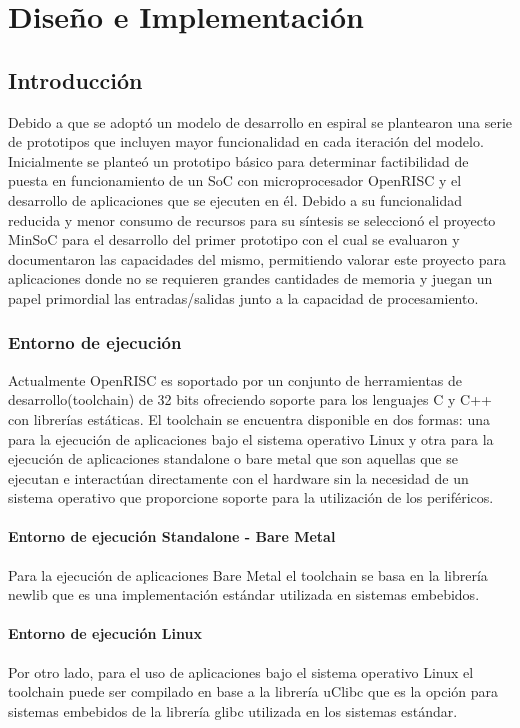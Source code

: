 \chapter{Diseño e Implementación}\label{chap:disenoeimpl}

	\section{Introducción}
	Debido a que se adoptó un modelo de desarrollo en espiral se plantearon una serie de prototipos que incluyen mayor funcionalidad en cada iteración
	del modelo. Inicialmente se planteó un prototipo básico para determinar factibilidad de puesta en funcionamiento de un SoC con microprocesador
	OpenRISC y el desarrollo de aplicaciones que se ejecuten en él. Debido a su funcionalidad reducida y menor consumo de recursos  para su síntesis se
	seleccionó el proyecto MinSoC para el desarrollo del primer prototipo con el cual se evaluaron y documentaron las capacidades del mismo, permitiendo
	valorar este proyecto para aplicaciones donde no se requieren grandes cantidades de memoria y juegan un papel primordial las entradas/salidas junto
	a la capacidad de procesamiento.  
		 
		\subsection{Entorno de ejecución}
		Actualmente OpenRISC es soportado por un conjunto de herramientas de desarrollo(toolchain) de 32 bits ofreciendo soporte para los lenguajes C y C++
		con librerías estáticas. El toolchain se encuentra disponible en dos formas: una para la ejecución de aplicaciones bajo el sistema operativo Linux y
		otra para la ejecución de aplicaciones standalone o bare metal que son aquellas que se ejecutan e interactúan directamente con el hardware sin la
		necesidad de un sistema operativo que proporcione soporte para la utilización de los periféricos.
		
			\subsubsection{Entorno de ejecución Standalone - Bare Metal}
	    	Para la ejecución de aplicaciones Bare Metal el toolchain se basa en la librería newlib que es una implementación estándar utilizada en
	    	sistemas embebidos. 
	    
			\subsubsection{Entorno de ejecución Linux}
			Por otro lado, para el uso de aplicaciones bajo el sistema operativo Linux el toolchain puede ser compilado en base a la librería uClibc que es la
			opción para sistemas embebidos de la librería glibc utilizada en los sistemas estándar.

